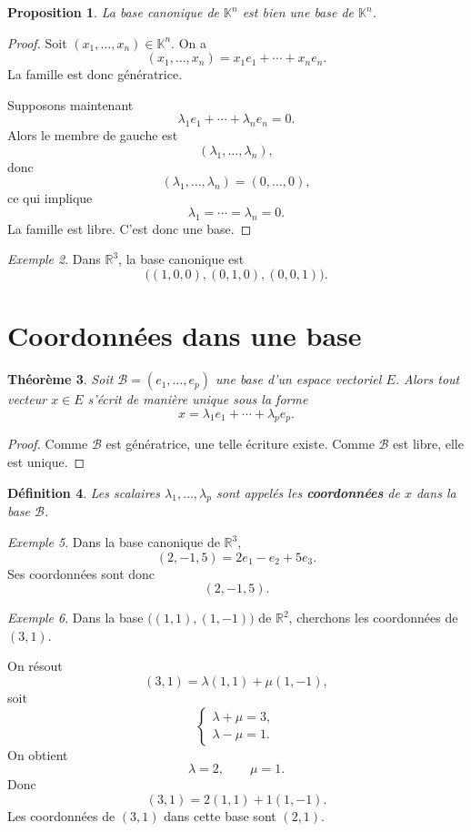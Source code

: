 \documentclass[11pt,a4paper]{article}
\newtheorem{definition}{Définition}[section]
\newtheorem{theoreme}[definition]{Théorème}
\newtheorem{proposition}[definition]{Proposition}
\theoremstyle{remark}
\newtheorem{exemple}[definition]{Exemple}
\newcommand{\R}{\mathbb{R}}
\newcommand{\K}{\mathbb{K}}
\begin{document}
\begin{proposition}
La base canonique de \(\K^n\) est bien une base de \(\K^n\).
\end{proposition}

\begin{proof}
Soit \((x_1,\dots,x_n)\in \K^n\). On a
\[
(x_1,\dots,x_n)=x_1e_1+\cdots+x_ne_n.
\]
La famille est donc génératrice.

Supposons maintenant
\[
\lambda_1e_1+\cdots+\lambda_ne_n=0.
\]
Alors le membre de gauche est
\[
(\lambda_1,\dots,\lambda_n),
\]
donc
\[
(\lambda_1,\dots,\lambda_n)=(0,\dots,0),
\]
ce qui implique
\[
\lambda_1=\cdots=\lambda_n=0.
\]
La famille est libre. C’est donc une base.
\end{proof}

\begin{exemple}
Dans \(\R^3\), la base canonique est
\[
\big((1,0,0),(0,1,0),(0,0,1)\big).
\]
\end{exemple}

\section{Coordonnées dans une base}

\begin{theoreme}
Soit \(\mathcal{B}=(e_1,\dots,e_p)\) une base d’un espace vectoriel \(E\). Alors tout vecteur \(x\in E\) s’écrit de manière unique sous la forme
\[
x=\lambda_1e_1+\cdots+\lambda_pe_p.
\]
\end{theoreme}

\begin{proof}
Comme \(\mathcal{B}\) est génératrice, une telle écriture existe. Comme \(\mathcal{B}\) est libre, elle est unique.
\end{proof}

\begin{definition}
Les scalaires \(\lambda_1,\dots,\lambda_p\) sont appelés les \textbf{coordonnées} de \(x\) dans la base \(\mathcal{B}\).
\end{definition}

\begin{exemple}
Dans la base canonique de \(\R^3\),
\[
(2,-1,5)=2e_1-e_2+5e_3.
\]
Ses coordonnées sont donc
\[
(2,-1,5).
\]
\end{exemple}

\begin{exemple}
Dans la base \(\big((1,1),(1,-1)\big)\) de \(\R^2\), cherchons les coordonnées de \((3,1)\).

On résout
\[
(3,1)=\lambda(1,1)+\mu(1,-1),
\]
soit
\[
\begin{cases}
\lambda+\mu=3,\\
\lambda-\mu=1.
\end{cases}
\]
On obtient
\[
\lambda=2,\qquad \mu=1.
\]
Donc
\[
(3,1)=2(1,1)+1(1,-1).
\]
Les coordonnées de \((3,1)\) dans cette base sont \((2,1)\).
\end{exemple}
\end{document}
